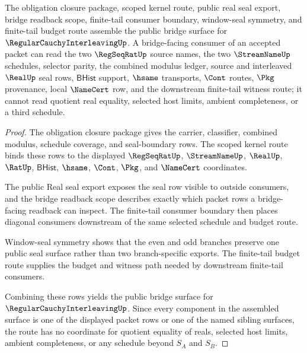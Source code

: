 \begin{theorem}
\label{thm:regular-cauchy-interleaving-public-bridge-readiness}
The obligation closure package, scoped kernel route, public real seal export, bridge readback scope, finite-tail consumer boundary, window-seal symmetry, and finite-tail budget route assemble the public bridge surface for $\RegularCauchyInterleavingUp$. A bridge-facing consumer of an accepted packet can read the two $\RegSeqRatUp$ source names, the two $\StreamNameUp$ schedules, selector parity, the combined modulus ledger, source and interleaved $\RealUp$ seal rows, $\mathsf{BHist}$ support, $\hsame$ transports, $\Cont$ routes, $\Pkg$ provenance, local $\NameCert$ row, and the downstream finite-tail witness route; it cannot read quotient real equality, selected host limits, ambient completeness, or a third schedule.
\end{theorem}
\begin{proof}
The obligation closure package gives the carrier, classifier, combined modulus, schedule coverage, and seal-boundary rows. The scoped kernel route binds these rows to the displayed $\RegSeqRatUp$, $\StreamNameUp$, $\RealUp$, $\RatUp$, $\mathsf{BHist}$, $\hsame$, $\Cont$, $\Pkg$, and $\NameCert$ coordinates.

The public Real seal export exposes the seal row visible to outside consumers, and the bridge readback scope describes exactly which packet rows a bridge-facing readback can inspect. The finite-tail consumer boundary then places diagonal consumers downstream of the same selected schedule and budget route.

Window-seal symmetry shows that the even and odd branches preserve one public seal surface rather than two branch-specific exports. The finite-tail budget route supplies the budget and witness path needed by downstream finite-tail consumers.

Combining these rows yields the public bridge surface for $\RegularCauchyInterleavingUp$. Since every component in the assembled surface is one of the displayed packet rows or one of the named sibling surfaces, the route has no coordinate for quotient equality of reals, selected host limits, ambient completeness, or any schedule beyond $S_A$ and $S_B$.
\end{proof}


